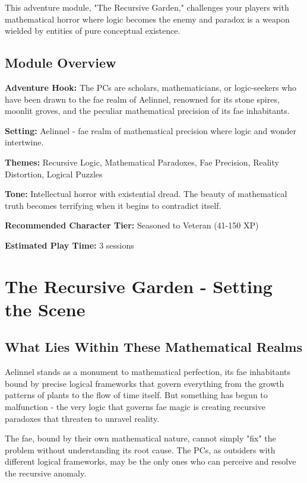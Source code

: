 \documentclass[11pt]{article}
\begin{document}
This adventure module, "The Recursive Garden," challenges your players with mathematical horror where logic becomes the enemy and paradox is a weapon wielded by entities of pure conceptual existence.

\subsection{Module Overview}

\textbf{Adventure Hook:} The PCs are scholars, mathematicians, or logic-seekers who have been drawn to the fae realm of Aelinnel, renowned for its stone spires, moonlit groves, and the peculiar mathematical precision of its fae inhabitants.

\textbf{Setting:} Aelinnel - fae realm of mathematical precision where logic and wonder intertwine.

\textbf{Themes:} Recursive Logic, Mathematical Paradoxes, Fae Precision, Reality Distortion, Logical Puzzles

\textbf{Tone:} Intellectual horror with existential dread. The beauty of mathematical truth becomes terrifying when it begins to contradict itself.

\textbf{Recommended Character Tier:} Seasoned to Veteran (41-150 XP)

\textbf{Estimated Play Time:} 3 sessions

\section{The Recursive Garden - Setting the Scene}

\subsection{What Lies Within These Mathematical Realms}

Aelinnel stands as a monument to mathematical perfection, its fae inhabitants bound by precise logical frameworks that govern everything from the growth patterns of plants to the flow of time itself. But something has begun to malfunction - the very logic that governs fae magic is creating recursive paradoxes that threaten to unravel reality.

The fae, bound by their own mathematical nature, cannot simply "fix" the problem without understanding its root cause. The PCs, as outsiders with different logical frameworks, may be the only ones who can perceive and resolve the recursive anomaly.
\end{document}
